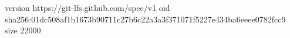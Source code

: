 version https://git-lfs.github.com/spec/v1
oid sha256:01dc508af1b1673b90711c27b6c22a3a3f371071f5227e434ba6eeee0782fcc9
size 22000
